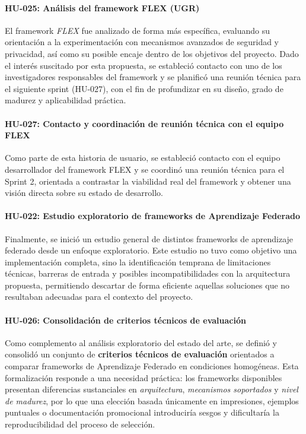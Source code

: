 \documentclass{report}
\begin{document}
\paragraph{HU-025: Análisis del framework FLEX (UGR)}
El framework \emph{FLEX} fue analizado de forma más específica, evaluando su orientación a la experimentación con mecanismos avanzados de seguridad y privacidad, así como su posible encaje dentro de los objetivos del proyecto. Dado el interés suscitado por esta propuesta, se estableció contacto con uno de los investigadores responsables del framework y se planificó una reunión técnica para el siguiente sprint (HU-027), con el fin de profundizar en su diseño, grado de madurez y aplicabilidad práctica.

\paragraph{HU-027: Contacto y coordinación de reunión técnica con el equipo FLEX}
Como parte de esta historia de usuario, se estableció contacto con el equipo desarrollador del framework FLEX y se coordinó una reunión técnica para el Sprint 2, orientada a contrastar la viabilidad real del framework y obtener una visión directa sobre su estado de desarrollo.

\paragraph{HU-022: Estudio exploratorio de frameworks de Aprendizaje Federado}
Finalmente, se inició un estudio general de distintos frameworks de aprendizaje federado desde un enfoque exploratorio. Este estudio no tuvo como objetivo una implementación completa, sino la identificación temprana de limitaciones técnicas, barreras de entrada y posibles incompatibilidades con la arquitectura propuesta, permitiendo descartar de forma eficiente aquellas soluciones que no resultaban adecuadas para el contexto del proyecto.

\paragraph{HU-026: Consolidación de criterios técnicos de evaluación}
Como complemento al análisis exploratorio del estado del arte, se definió y consolidó un conjunto de \textbf{criterios técnicos de evaluación} orientados a comparar frameworks de Aprendizaje Federado en condiciones homogéneas. Esta formalización responde a una necesidad práctica: los frameworks disponibles presentan diferencias sustanciales en \textit{arquitectura}, \textit{mecanismos soportados} y \textit{nivel de madurez}, por lo que una elección basada únicamente en impresiones, ejemplos puntuales o documentación promocional introduciría sesgos y dificultaría la reproducibilidad del proceso de selección.
\end{document}
